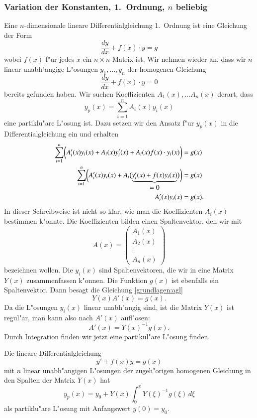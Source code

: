 \subsubsection{Variation der Konstanten, 1.~Ordnung, $n$ beliebig}
Eine $n$-dimensionale lineare Differentialgleichung 1.~Ordnung ist
eine Gleichung der Form
\[
\frac{dy}{dx}+f(x)\cdot y = g
\]
wobei $f(x)$ f"ur jedes $x$ ein $n\times n$-Matrix ist.
Wir nehmen wieder an, dass wir $n$ linear unabh"angige L"osungen
$y_1,\dots,y_n$ der homogenen Gleichung
\[
\frac{dy}{dx}+f(x)\cdot y=0
\]
bereits gefunden haben.
Wir suchen Koeffizienten $A_1(x),\dots A_n(x)$ derart, dass
\[
y_p(x)=\sum_{i=1}^n A_i(x)y_i(x)
\]
eine partiklu"are L"osung ist.
Dazu setzen wir den Ansatz f"ur $y_p(x)$ in die Differentialgleichung
ein und erhalten
\begin{align}
\sum_{i=1}^n\biggl(
A'_i(x)y_i(x) + A_i(x)y_i'(x)
+
A_i(x)f(x)\cdot y_i(x)\biggr)
&=
g(x)
\notag
\\
\sum_{i=1}^n\biggl(
A_i'(x)y_i(x) + A_i\bigl(\underbrace{y_i'(x)+f(x)y_i(x)}_{\displaystyle =0}\bigr)
\biggr)
&=
g(x)
\notag
\\
A_i'(x)y_i(x)&=g(x).
\label{grundlagen:agl}
\end{align}
In dieser Schreibweise ist nicht so klar, wie man die Koeffizienten
$A_i(x)$ bestimmen k"onnte.
Die Koeffizienten bilden einen Spaltenvektor, den wir mit
\[
A(x)=\begin{pmatrix}
A_1(x)\\
A_2(x)\\
\vdots\\
A_n(x)
\end{pmatrix}
\]
bezeichnen wollen.
Die $y_i(x)$ sind Spaltenvektoren, die wir
in eine Matrix $Y(x)$ zusammenfassen k"onnen.
Die Funktion $g(x)$ ist ebenfalls ein Spaltenvektor.
Dann besagt die Gleichung \eqref{grundlagen:agl}
\[
Y(x)A'(x)=g(x).
\]
Da die L"osungen $y_i(x)$ linear unabh"angig sind, ist die Matrix
$Y(x)$ ist regul"ar, man kann also nach $A'(x)$ aufl"osen:
\[
A'(x)=Y(x)^{-1}g(x).
\]
Durch Integration finden wir jetzt eine partikul"are L"osung finden.

\begin{satz}
Die lineare Differentialgleichung 
\[
y'+f(x)y=g(x)
\]
mit $n$ linear unabh"angigen L"osungen der zugeh"origen homogenen 
Gleichung in den Spalten der Matrix $Y(x)$ hat
\[
y_p(x)=y_0+Y(x)\int_0^x Y(\xi)^{-1}g(\xi)\,d\xi
\]
als partiklu"are L"osung mit Anfangswert $y(0)=y_0$.
\end{satz}

